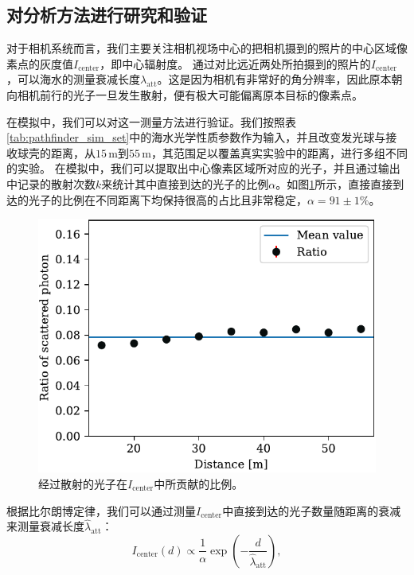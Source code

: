 \subsection{对分析方法进行研究和验证}
\label{sec:pathfinder_verification}

对于相机系统而言，我们主要关注相机视场中心的把相机摄到的照片的中心区域像素点的灰度值$I_\mathrm{center}$，即中心辐射度。
通过对比远近两处所拍摄到的照片的$I_\mathrm{center}$，可以海水的测量衰减长度$\lambda_\mathrm{att}$。这是因为相机有非常好的角分辨率，因此原本朝向相机前行的光子一旦发生散射，便有极大可能偏离原本目标的像素点。

在模拟中，我们可以对这一测量方法进行验证。我们按照表\ref{tab:pathfinder_sim_set}中的海水光学性质参数作为输入，并且改变发光球与接收球壳的距离，从$15\, \mathrm{m}$到$55\, \mathrm{m}$，其范围足以覆盖真实实验中的距离，进行多组不同的实验。
在模拟中，我们可以提取出中心像素区域所对应的光子，并且通过输出中记录的散射次数$k$来统计其中直接到达的光子的比例$\alpha$。如图\ref{fig:pathfinder_sim_cam_sca_ratio}所示，直接直接到达的光子的比例在不同距离下均保持很高的占比且非常稳定，$\alpha = 91 \pm 1 \%$。

\begin{figure}[htp]
    \centering
    \includegraphics[width=0.65\linewidth]{img/pathfinder_sim_cam_sca_ratio.pdf}
    \caption{经过散射的光子在$I_\mathrm{center}$中所贡献的比例。}
    \label{fig:pathfinder_sim_cam_sca_ratio}
\end{figure}

根据比尔朗博定律\cite{Beer_Lambert_law:2020}，我们可以通过测量$I_\mathrm{center}$中直接到达的光子数量随距离的衰减来测量衰减长度$\hat{\lambda}_\mathrm{att}$：
\begin{equation}
    I_{\mathrm{center}}(d) \propto \frac{1}{\alpha} \exp(-\frac{d}{\hat{\lambda}_\mathrm{att}}) , 
    \label{eq:pathfinder_cam_Icenter_def}
\end{equation}

